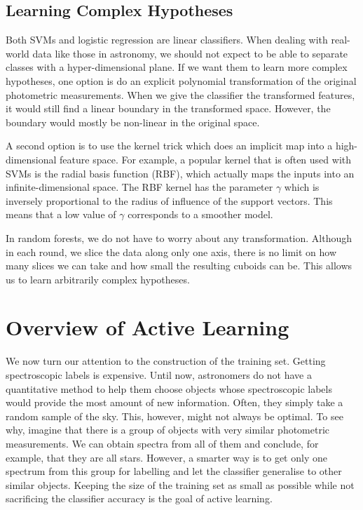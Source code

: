 \subsection{Learning Complex Hypotheses}
\label{sub:complex}

Both SVMs and logistic regression are linear classifiers. When dealing with real-world data like
those in astronomy, we should not expect to be able to separate classes with a hyper-dimensional
plane. If we want them to learn more complex hypotheses, one option is do an explicit polynomial
transformation of the original photometric measurements. When we give the classifier the transformed
features, it would still find a linear boundary in the transformed space. However, the boundary
would mostly be non-linear in the original space.

A second option is to use the kernel trick which does an implicit map into a high-dimensional
feature space. For example, a popular kernel that is often used with SVMs is the radial basis
function (RBF), which actually maps the inputs into an infinite-dimensional space. The RBF kernel
has the parameter $\gamma$ which is inversely proportional to the radius of influence of the
support vectors. This means that a low value of $\gamma$ corresponds to a smoother model.

In random forests, we do not have to worry about any transformation. Although in each round, we
slice the data along only one axis, there is no limit on how many slices we can take and how small
the resulting cuboids can be. This allows us to learn arbitrarily complex hypotheses.


\section{Overview of Active Learning}
\label{sec:active}

We now turn our attention to the construction of the training set. Getting spectroscopic labels is
expensive. Until now, astronomers do not have a quantitative method to help them choose objects
whose spectroscopic labels would provide the most amount of new information. Often, they simply
take a random sample of the sky. This, however, might not always be optimal. To see why, imagine
that there is a group of objects with very similar photometric measurements. We can obtain spectra
from all of them and conclude, for example, that they are all stars. However, a smarter way is to
get only one spectrum from this group for labelling and let the classifier generalise to other
similar objects. Keeping the size of the training set as small as possible while not sacrificing
the classifier accuracy is the goal of active learning.

